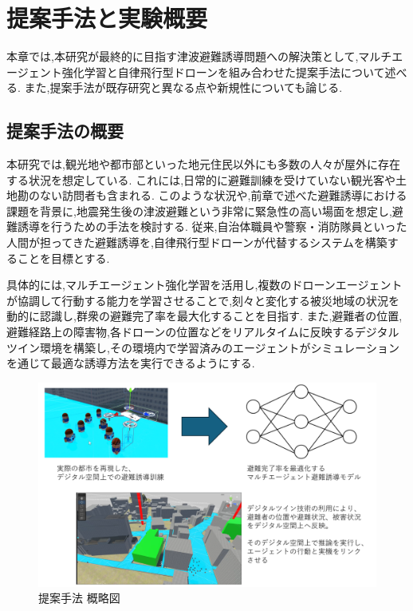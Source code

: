 \chapter{提案手法と実験概要}  
本章では,本研究が最終的に目指す津波避難誘導問題への解決策として,マルチエージェント強化学習と自律飛行型ドローンを組み合わせた提案手法について述べる.
また,提案手法が既存研究と異なる点や新規性についても論じる.

\section{提案手法の概要} 
\label{sec:sug} 
本研究では,観光地や都市部といった地元住民以外にも多数の人々が屋外に存在する状況を想定している.
これには,日常的に避難訓練を受けていない観光客や土地勘のない訪問者も含まれる.
このような状況や,前章で述べた避難誘導における課題を背景に,地震発生後の津波避難という非常に緊急性の高い場面を想定し,避難誘導を行うための手法を検討する.
従来,自治体職員や警察・消防隊員といった人間が担ってきた避難誘導を,自律飛行型ドローンが代替するシステムを構築することを目標とする.

具体的には,マルチエージェント強化学習を活用し,複数のドローンエージェントが協調して行動する能力を学習させることで,刻々と変化する被災地域の状況を動的に認識し,群衆の避難完了率を最大化することを目指す.
また,避難者の位置,避難経路上の障害物,各ドローンの位置などをリアルタイムに反映するデジタルツイン環境を構築し,その環境内で学習済みのエージェントがシミュレーションを通じて最適な誘導方法を実行できるようにする.

\begin{figure}[H] 
  \centering 
  \includegraphics[width=1.0\textwidth]{Figures/2024-12-06 182816.png}
  \caption{提案手法 概略図} 
  \label{fig:01} 
\end{figure}

